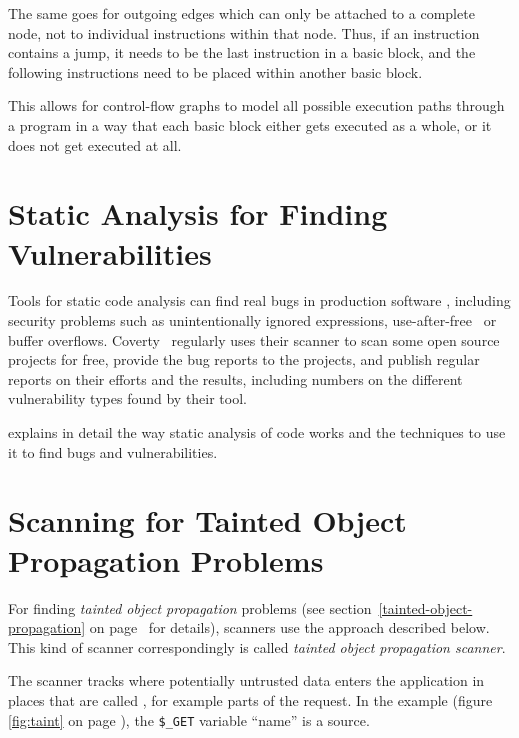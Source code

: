 The same goes for outgoing edges which can only be attached to a complete node, not to individual instructions within that node. Thus, if an instruction contains a jump, it needs to be the last instruction in a basic block, and the following instructions need to be placed within another basic block.

This allows for control-flow graphs to model all possible execution paths through a program in a way that each basic block either gets executed as a whole, or it does not get executed at all.



\section{Static Analysis for Finding Vulnerabilities}

Tools for static code analysis can find real bugs in production software \cite{findbugs, evaluating}, including security problems such as unintentionally ignored expressions, use-after-free~\cite{use-after-free-definition} or buffer overflows. Coverty~\cite{coverity-report} regularly uses their scanner to scan some open source projects for free, provide the bug reports to the projects, and publish regular reports on their efforts and the results, including numbers on the different vulnerability types found by their tool.

\cite{chess-west} explains in detail the way static analysis of code works and the techniques to use it to find bugs and vulnerabilities.



\section{Scanning for Tainted Object Propagation Problems}
\label{tainting}

For finding \emph{tainted object propagation} problems (see section~\ref{tainted-object-propagation} on page~\pageref{tainted-object-propagation} for details), scanners use the approach described below.~\cite{finding-security-vulnerabilities, chess-west} This kind of scanner correspondingly is called \emph{tainted object propagation scanner}.

The scanner tracks where potentially untrusted data enters the application in places that are called , for example parts of the request. In the example (figure \ref{fig:taint} on page \pageref{fig:taint}), the \texttt{\$\_GET} variable ``name'' is a source.

